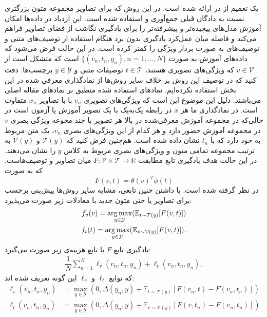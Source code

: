  یک تعمیم  از  در \cite{Reed2016} ارائه شده است. در این روش که برای تصاویر مجموعه متون بزرگتری نسبت به دادگان قبلی جمع‌آوری و استفاده شده است.
  این ازدیاد در داده‌ها امکان آموزش مدل‌های پیچیده‌تر و پیشرفته‌تر را برای یادگیری نگاشت از فضای تصاویر فراهم می‌کند و فاصله میان عمل‌کرد یادگیری بدون برد هنگام استفاده از
  توصیف‌های متنی و توصیف‌های به صورت بردار ویژگی را کمتر کرده است.
  در این حالت فرض می‌شود که داده‌های آموزش به صورت
   $\{(v_{n},t_{n},y_{n}), n = 1, ..., N\}$
   است که متشکل است از
    $v \in \mathcal{V}$
    که ویژگی‌های تصویری هستند،
     $t \in \mathcal{T}$ توصیفات متنی و $y \in \mathcal{Y}$ برچسب‌ها.
      دقت کنید که در توصیف این روش بر خلاف سایر روش‌ها از نمادگذاری معرفی شده در این بخش استفاده نکرده‌ایم.
      نمادهای استفاده شده منطبق بر نمادهای مقاله اصلی می‌باشند. دلیل این موضوع این است که ویژگی‌های تصویری $v_n$ با با تصاویر  $x_n$ متفاوت است. در نمادگذاری ما هر $x$ در رابطه یک‌به‌یک با یک تصویر آموزش یا آزمون است در حالی‌که در مجموعه آموزش معرفی‌شده در بالا هر تصویر با چند مجوعه ویژگی بصری $v$ در مجموعه آموزش حضور دارد و هر کدام از این ويژگی‌های بصری $v_n$، یک متن مربوط به خود دارد که با $t_n$ نشان داده ‌شده است. هم‌چنین فرض کنید که  $\mathcal{T}(y)$ و $\mathcal{V}(y)$ به ترتیب مجموعه تمامی متون و ویژگی‌های بصری مربوط به کلاس $y$ را نشان می‌دهند.
  در این حالت هدف یادگیری تابع مطابقت $F : \mathcal{V} \times \mathcal{T} \rightarrow \mathbb{R}$ میان تصاویر و توصیف‌هاست. که به صورت
  \begin{equation}
  \label{eq:akata16comp}
F(v, t) = \theta(v)^T\phi(t)
  \end{equation}
در نظر گرفته شده است. با داشتن چنین تابعی، مشابه سایر روش‌ها پیش‌بنی برچسب برای تصاویر یا حتی متون جدید با معادلات زیر صورت می‌پذیرد:
\begin{align}
\label{eq:akata16class}
f_v(v) = \underset{y \in \mathcal{Y}}{\operatorname*{arg\,max}} ( \mathbb{ E}_{t \sim \mathcal{T}(y)}[F(v, t)])\\
f_t(t) = \underset{y \in \mathcal{Y}}{\operatorname*{arg\,max}} (\mathbb{ E}_{v \sim \mathcal{V}(y)}[F(v, t)]).
\end{align}
یادگیری تابع $F$ با تابع هزینه‌ی زیر صورت می‌گیرد:
\begin{align}
\label{eq:objective_actual}
\dfrac{1}{N}\sum_{n=1}^{N} \ell_v(v_n, t_n, y_n) + \ell_t(v_n, t_n, y_n),
\end{align}
که توابع $ \ell_t$ و $\ell_v$ این گونه تعریف شده اند:
\begin{align*}
\ell_v(v_n, t_n, y_n) &=  \underset{y \in \mathcal{Y}}{\max}(0,\Delta(y_n, y) + \mathbb{E}_{t \sim \mathcal{T}(y)} [ F(v_n,t) - F(v_n,t_n) ]) \\
\ell_t(v_n, t_n, y_n) &= \underset{y \in \mathcal{Y}}{\max}(0,\Delta(y_n, y) + \mathbb{E}_{v \sim \mathcal{V}(y)} [ F(v,t_n) - F(v_n,t_n)])
\end{align*}
